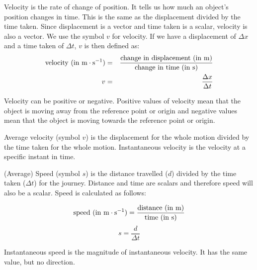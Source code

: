 
Velocity is the rate of change of position. It tells us how much an object's position changes in time. This is the same as the displacement divided by the time taken. Since displacement is a vector and time taken is a scalar, velocity is also a vector. We use the symbol ${v}$ for velocity. If we have a displacement of $\Delta x$ and a time taken of $\Delta t$, ${v}$ is then defined as:
\begin{eqnarray*}
\rm{velocity\ (in\ m} \cdot \rm{s}^{-1}) &=& \frac{\rm{change\ in\ displacement\ (in\ m)}}{\rm{change\ in\ time\ (in\ s)}}\\
v &=& \frac{\Delta x}{\Delta t}
\end{eqnarray*}\label{eq:pr:velocity}

Velocity can be positive or negative. Positive values of velocity mean that the object is moving away from the reference point or origin and negative values mean that the object is moving towards the reference point or origin.


Average velocity (symbol ${v}$) is the displacement for the whole motion divided by the time taken for the whole motion. Instantaneous velocity is the velocity at a specific instant in time. 

(Average) Speed (symbol $s$) is the distance travelled ($d$) divided by the time taken ($\Delta t$) for the journey. Distance and time are scalars and therefore speed will also be a scalar. Speed is calculated as follows:

\begin{equation*}
\rm{speed}\ (in\ m \cdot s^{-1}) = \frac{\rm{distance\ (in\ m)}}{\rm{time\ (in\ s)}}
\end{equation*}
\begin{equation*}
s=\frac{d}{\Delta t}
\end{equation*}\label{eq:pr:speed}

Instantaneous speed is the magnitude of instantaneous velocity. It has the same value, but no direction.

